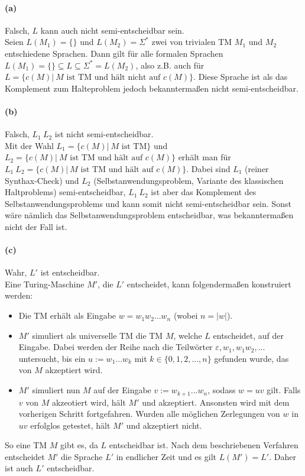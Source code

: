 
\paragraph{(a)}
	Falsch, $L$ kann auch nicht semi-entscheidbar sein.\\
	Seien $L(M_1)=\{\}$ und $L(M_2)=\Sigma^*$ zwei von trivialen TM $M_1$ und $M_2$ entschiedene Sprachen. Dann gilt für alle formalen Sprachen $L(M_1)=\{\}\subseteq L\subseteq \Sigma^*=L(M_2)$, also z.B. auch für $L=\{c(M) |\ M \text{ ist TM und hält nicht auf } c(M)\}$. Diese Sprache ist als das Komplement zum Halteproblem jedoch bekanntermaßen nicht semi-entscheidbar.
	
\paragraph{(b)}
	Falsch, $L_1 \ L_2$ ist nicht semi-entscheidbar.\\
	Mit der Wahl $L_1=\{c(M) |\ M \text{ ist TM}\}$ und $L_2=\{c(M) |\ M \text{ ist TM und hält auf } c(M)\}$ erhält man für $L_1 \ L_2 = \{c(M) |\ M \text{ ist TM und hält auf } c(M)\}$. Dabei sind $L_1$ (reiner Synthax-Check) und $L_2$ (Selbstanwendungsproblem, Variante des klassischen Haltproblems) semi-entscheidbar, $L_1 \ L_2$ ist aber das Komplement des Selbstanwendungsproblems und kann somit nicht semi-entscheidbar sein. Sonst wäre nämlich das Selbstanwendungsproblem entscheidbar, was bekanntermaßen nicht der Fall ist.
	
\paragraph{(c)}
	Wahr, $L'$ ist entscheidbar.\\
	Eine Turing-Maschine $M'$, die $L'$ entscheidet, kann folgendermaßen konstruiert werden:
	\begin{itemize}
    	\item Die TM erhält als Eingabe $w = w_1w_2...w_n$ (wobei $n=|w|$).
    	\item $M'$ simuliert als universelle TM die TM $M$, welche $L$ entscheidet, auf der Eingabe. Dabei werden der Reihe nach die Teilwörter $\varepsilon,w_1,w_1w_2,...$ untersucht, bis ein $u:=w_1...w_k$ mit $k \in \{0,1,2,...,n\}$ gefunden wurde, das von $M$ akzeptiert wird.
    	\item $M'$ simuliert nun $M$ auf der Eingabe $v:=w_{k+1}...w_n$, sodass $w=uv$ gilt. Falls $v$ von $M$ akzeotiert wird, hält $M'$ und akzeptiert. Ansonsten wird mit dem vorherigen Schritt fortgefahren. Wurden alle möglichen Zerlegungen von $w$ in $uv$ erfolglos getestet, hält $M'$ und akzeptiert nicht.
    \end{itemize}
    So eine TM $M$ gibt es, da $L$ entscheidbar ist. Nach dem beschriebenen Verfahren entscheidet $M'$ die Sprache $L'$ in endlicher Zeit und es gilt $L(M')=L'$. Daher ist auch $L'$ entscheidbar.
    
